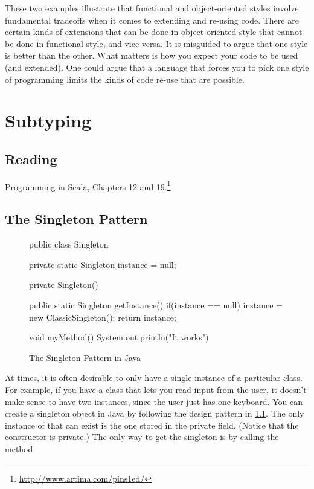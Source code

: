 \documentclass[9pt]{extbook}
\begin{document}
These two examples illustrate that functional
and object-oriented styles involve fundamental tradeoffs when it comes
to extending and re-using code. There are certain kinds of extensions
that can be done in object-oriented style that cannot be done in
functional style, and vice versa.  It is misguided to argue that
one style is better than the other. What matters is how you expect your code
to be used (and extended). One could argue that a language that forces you to
pick one style of programming limits the kinds of code re-use that are possible.

\chapter{Subtyping}

\section{Reading}

Programming in Scala, Chapters 12 and 19.\footnote{\url{http://www.artima.com/pins1ed/}}

\section{The Singleton Pattern}

\begin{figure}
\begin{javacode}
public class Singleton {
  private static Singleton instance = null;

  private Singleton() { }

  public static Singleton getInstance() {
    if(instance == null) {
      instance = new ClassicSingleton();
    }
    return instance;
  }

  void myMethod() {
    System.out.println("It works")
  }

}
\end{javacode}
\caption{The Singleton Pattern in Java}
\label{javasingleton}
\end{figure}

At times, it is often desirable to only have a single instance of a particular
class. For example, if you have a class that lets you read input from the
user, it doesn't make sense to have two instances, since the user just has
one keyboard. You can create a singleton object in Java by following the
design pattern in \cref{javasingleton}. The only instance of 
that can exist is the one stored in the private field. (Notice that the constructor
is private.) The only way to get
the singleton is by calling the  method.
\end{document}
